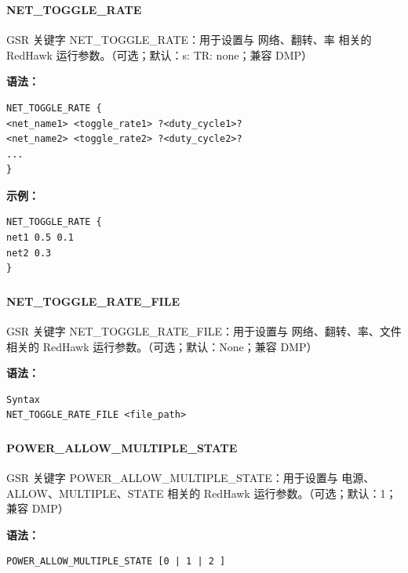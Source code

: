 \subsubsection{}
\paragraph*{NET_TOGGLE_RATE}

GSR 关键字 NET_TOGGLE_RATE：用于设置与 网络、翻转、率 相关的 RedHawk 运行参数。（可选；默认：s: TR: none；兼容 DMP）

\textbf{语法：}
\begin{lstlisting}
NET_TOGGLE_RATE {
<net_name1> <toggle_rate1> ?<duty_cycle1>?
<net_name2> <toggle_rate2> ?<duty_cycle2>?
...
}
\end{lstlisting}

\textbf{示例：}
\begin{lstlisting}
NET_TOGGLE_RATE {
net1 0.5 0.1
net2 0.3
}
\end{lstlisting}

\subsubsection{}
\paragraph*{NET_TOGGLE_RATE_FILE}

GSR 关键字 NET_TOGGLE_RATE_FILE：用于设置与 网络、翻转、率、文件 相关的 RedHawk 运行参数。（可选；默认：None；兼容 DMP）

\textbf{语法：}
\begin{lstlisting}
Syntax
NET_TOGGLE_RATE_FILE <file_path>
\end{lstlisting}

\subsubsection{}
\paragraph*{POWER_ALLOW_MULTIPLE_STATE}

GSR 关键字 POWER_ALLOW_MULTIPLE_STATE：用于设置与 电源、ALLOW、MULTIPLE、STATE 相关的 RedHawk 运行参数。（可选；默认：1；兼容 DMP）

\textbf{语法：}
\begin{lstlisting}
POWER_ALLOW_MULTIPLE_STATE [0 | 1 | 2 ]
\end{lstlisting}

